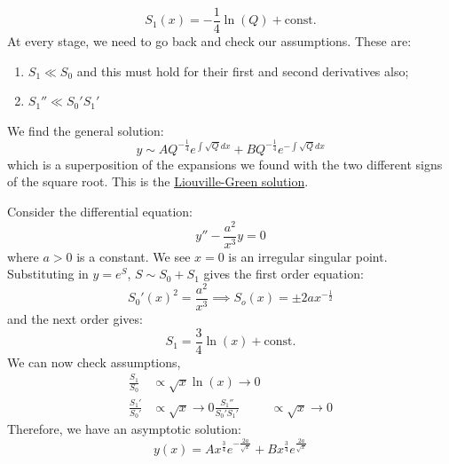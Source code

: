 \documentclass[../Main.tex]{subfiles}
\begin{document}
\begin{equation*}
    S_1(x) = -\frac14 \ln(Q) + \text{const}.
\end{equation*}
At every stage, we need to go back and check our assumptions. These are:
\begin{enumerate}
    \item $S_1 \ll S_0$ and this must hold for their first and second derivatives also;
    \item $S_1'' \ll S_0' S_1'$
\end{enumerate}
We find the general solution:
\begin{equation*}
    y \sim AQ^{-\frac14} e^{\int \sqrt{Q} dx} + BQ^{-\frac14} e^{-\int \sqrt{Q} dx}
\end{equation*}
which is a superposition of the expansions we found with the two different signs of the square root. This is the \underline{Liouville-Green solution}.
\begin{example}
    Consider the differential equation:
    \begin{equation*}
        y'' - \frac{a^2}{x^3}y = 0
    \end{equation*}
    where $a > 0$ is a constant. We see $x = 0$ is an irregular singular point. Substituting in $y = e^S$, $S \sim S_0 + S_1$ gives the first order equation:
    \begin{equation*}
        S_0'(x)^2 = \frac{a^2}{x^3} \implies S_o(x) = \pm 2a x^{-\frac12}
    \end{equation*}
    and the next order gives:
    \begin{equation*}
        S_1 = \frac34 \ln(x) + \text{const}.
    \end{equation*}
    We can now check assumptions,
    \begin{align*}
        \frac{S_1}{S_0} &\propto \sqrt{x} \ln(x) \to 0 \\
        \frac{S_1'}{S_0'} &\propto \sqrt{x} \to 0
        \frac{S_1''}{S_0' S_1'} &\propto \sqrt{x} \to 0
    \end{align*}
    Therefore, we have an asymptotic solution:
    \begin{equation*}
        y(x) = Ax^{\frac34} e^{-\frac{2a}{\sqrt{x}}} + Bx^{\frac34} e^{\frac{2a}{\sqrt{x}}}
    \end{equation*}
\end{example}
\end{document}
